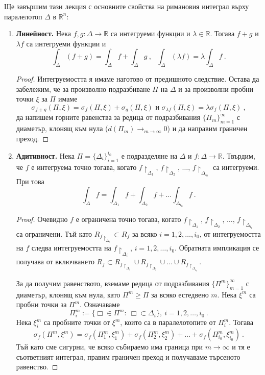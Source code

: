 \documentclass[11pt]{article}
\numberwithin{equation}{section}
\numberwithin{figure}{section}
\numberwithin{table}{section}
\theoremstyle{plain}
\theoremstyle{definition}
\theoremstyle{remark}
\theoremstyle{definition}
\theoremstyle{remark}
\theoremstyle{plain}
\theoremstyle{definition}
\theoremstyle{definition}
\theoremstyle{plain}
\theoremstyle{plain}
\theoremstyle{plain}
\theoremstyle{definition}
\theoremstyle{plain}
\newcommand*{\R}{\mathbb{R}}
\begin{document}
Ще завършим тази лекция с основните свойства на римановия интеграл върху паралелотоп $\Delta$ в $\R^n$:
\medskip

\begin{enumerate}
\item \textbf{Линейност.} Нека $f, g: \Delta \longrightarrow\R$ са интегруеми функции и $\lambda\in \R$. Тогава
$f+g$ и $\lambda f$ са интегруеми функции и
$$\int_\Delta (f+g) = \int_\Delta f + \int_\Delta g  \ , \ \ \ \int_\Delta (\lambda f)=\lambda\int_\Delta f \ .$$

\begin{proof}
Интегруемостта я имаме наготово от предишното следствие. Остава да забележим, че за произволно подразбиване $\Pi$ на $\Delta$ и за произволни пробни точки $\xi$ за $\Pi$ имаме
$$\sigma_{f+g} (\Pi ,\xi )=\sigma_{f} (\Pi ,\xi )+\sigma_{g} (\Pi ,\xi ) \mbox{ и } \sigma_{\lambda f} (\Pi ,\xi )= \lambda\sigma_{f} (\Pi ,\xi ) \ ,$$
да напишем горните равенства за редица от подразбивания $\{ \Pi_m\}_{m=1}^\infty$ с диаметър, клонящ към нула ($d(\Pi_m)\longrightarrow_{m\to \infty}0$) и да направим граничен преход.
\end{proof}

\item \textbf{Адитивност.} Нека $\Pi = \{ \Delta_i\}_{i=1}^{i_0}$ е подразделяне на $\Delta$ и $f:\Delta\longrightarrow\R$. Твърдим, че $f$ е интегруема точно тогава, когато $f\restriction_{\Delta_1}$, $f\restriction_{\Delta_2}$, $\dots$, $f\restriction_{\Delta_{i_0}}$ са интегруеми. При това
$$\int_\Delta f = \int_{\Delta_1} f + \int_{\Delta_2} f + \dots \int_{\Delta_{i_0}} f \ .$$

\begin{proof}
Очевидно $f$ е ограничена точно тогава, когато $f\restriction_{\Delta_1}$, $f\restriction_{\Delta_2}$, $\dots$, $f\restriction_{\Delta_{i_0}}$ са ограничени. Тъй като $R_{f\restriction_{\Delta_i}}\subset R_f$ за всяко $i=1,2,\dots ,i_0$, от интегруемостта на $f$ следва интегруемостта на $f\restriction_{\Delta_i}$, $i=1,2,\dots ,i_0$. Обратната импликация се получава от включването $R_f \subset R_{f\restriction_{\Delta_1}}\cup R_{f\restriction_{\Delta_2}}\cup \dots \cup R_{f\restriction_{\Delta_{i_0}}}$.

За да получим равенството, вземаме редица от подразбивания $\{ \Pi^m\}_{m=1}^\infty$ с диаметър, клонящ към нула, като $\Pi^m \ge \Pi$ за всяко естедвено $m$. Нека $\xi^m$ са пробни точки за $\Pi^m$. Означаваме
$$\Pi^m_i:=\{ \Box \in \Pi^m: \ \Box\subset \Delta_i\}, \ i=1,2,\dots ,i_0 \ .$$
Нека $\xi^m_i$ са пробните точки от $\xi^m$, които са в паралелотопите от $\Pi^m_i$. Тогава
$$\sigma_f(\Pi^m,\xi^m)=\sigma_f(\Pi^m_1,\xi^m_1)+\sigma_f(\Pi^m_2,\xi^m_2)+\dots +\sigma_f(\Pi^m_{i_0},\xi^m_{i_0}) \ .$$
Тъй като сме сигурни, че всяко събираемо има граница при $m\rightarrow \infty$ и тя е съответният интеграл, правим граничен преход и получаваме търсеното равенство.
\end{proof}


\end{enumerate}
\end{document}
